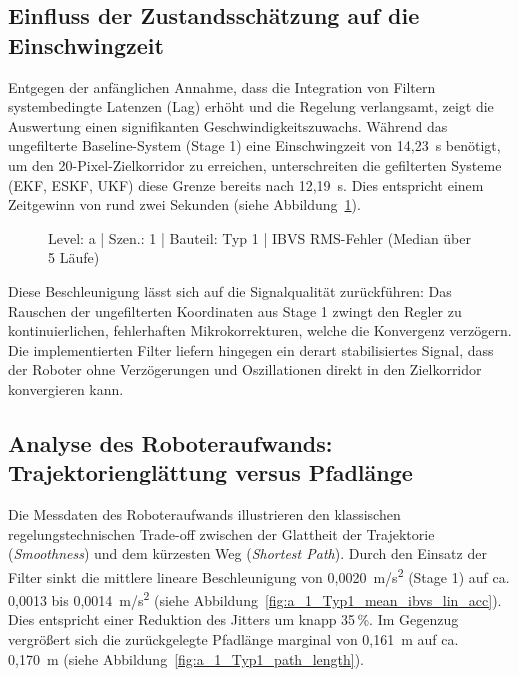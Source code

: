 \subsection{Einfluss der Zustandsschätzung auf die Einschwingzeit}
\label{sec:ergebnisse_settling_time}

Entgegen der anfänglichen Annahme, dass die Integration von Filtern systembedingte Latenzen (Lag) erhöht und die Regelung verlangsamt, zeigt die Auswertung einen signifikanten Geschwindigkeitszuwachs. Während das ungefilterte Baseline-System (Stage 1) eine Einschwingzeit von 14,23~s benötigt, um den 20-Pixel-Zielkorridor zu erreichen, unterschreiten die gefilterten Systeme (\ac{EKF}, \ac{ESKF}, UKF) diese Grenze bereits nach 12,19~s. Dies entspricht einem Zeitgewinn von rund zwei Sekunden (siehe Abbildung~\ref{fig:a_1_Typ1_timeseries_median_ibvs_rms_px}). 

\begin{figure}[htbp]
    \centering
    \caption{Level: a | Szen.: 1 | Bauteil: Typ 1 | IBVS RMS-Fehler (Median über 5 Läufe)}
    \label{fig:a_1_Typ1_timeseries_median_ibvs_rms_px}
\end{figure}

Diese Beschleunigung lässt sich auf die Signalqualität zurückführen: Das Rauschen der ungefilterten Koordinaten aus Stage 1 zwingt den Regler zu kontinuierlichen, fehlerhaften Mikrokorrekturen, welche die Konvergenz verzögern. Die implementierten Filter liefern hingegen ein derart stabilisiertes Signal, dass der Roboter ohne Verzögerungen und Oszillationen direkt in den Zielkorridor konvergieren kann.

\subsection{Analyse des Roboteraufwands: Trajektorienglättung versus Pfadlänge}
\label{sec:ergebnisse_robot_effort}

Die Messdaten des Roboteraufwands illustrieren den klassischen regelungstechnischen Trade-off zwischen der Glattheit der Trajektorie (\textit{Smoothness}) und dem kürzesten Weg (\textit{Shortest Path}). Durch den Einsatz der Filter sinkt die mittlere lineare Beschleunigung von 0,0020~m/s\textsuperscript{2} (Stage 1) auf ca. 0,0013 bis 0,0014~m/s\textsuperscript{2} (siehe Abbildung~\ref{fig:a_1_Typ1_mean_ibvs_lin_acc}). Dies entspricht einer Reduktion des Jitters um knapp 35\,\%. Im Gegenzug vergrößert sich die zurückgelegte Pfadlänge marginal von 0,161~m auf ca. 0,170~m (siehe Abbildung~\ref{fig:a_1_Typ1_path_length}). 

